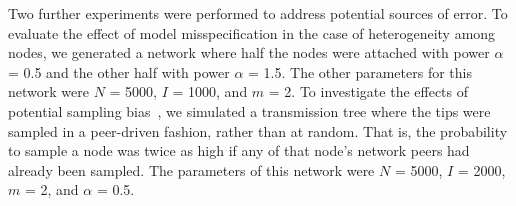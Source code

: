 %
%
%  

Two further experiments were performed to address potential sources of error.
To evaluate the effect of model misspecification in the case of heterogeneity
among nodes, we generated a network where half the nodes were attached with
power $\alpha$ = 0.5 and the other half with power $\alpha$ = 1.5. The other
parameters for this network were $N$ = 5000, $I$ = 1000, and $m$ = 2. To
investigate the effects of potential sampling
bias~\autocite{karcher2016quantifying}, we simulated a transmission tree where
the tips were sampled in a peer-driven fashion, rather than at random. That is,
the probability to sample a node was twice as high if any of that node's
network peers had already been sampled. The parameters of this network were $N$
= 5000, $I$ = 2000, $m$ = 2, and $\alpha$ = 0.5.

